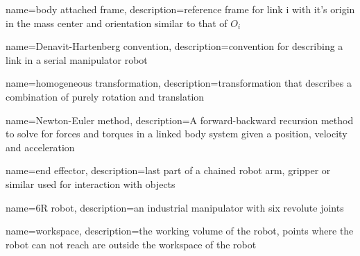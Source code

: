 \makeglossaries
 
 
{
    name={body attached frame},
    description={reference frame for link i with it's origin in the mass center and orientation similar to that of $O_i$}
}

{
    name={Denavit-Hartenberg convention},
    description={convention for describing a link in a serial manipulator robot}
}

{
    name={homogeneous transformation},
    description={transformation that describes a combination of purely rotation and translation}
}


{
    name={Newton-Euler method},
    description={A forward-backward recursion method to solve for forces and torques in a linked body system given a position, velocity and acceleration}
}

{
    name={end effector},
    description={last part of a chained robot arm, gripper or similar used for interaction with objects}
}

{
    name={6R robot},
    description={an industrial manipulator with six revolute joints}
}

{
    name={workspace},
    description={the working volume of the robot, points where the robot can not reach are outside the workspace of the robot}
}



